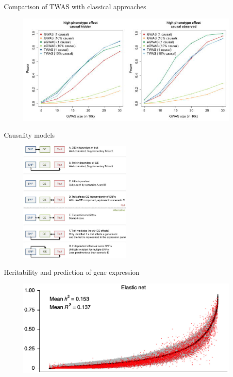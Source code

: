 \documentclass[aspectratio=169,12pt]{beamer}
\begin{document}
\begin{frame}{Comparison of TWAS with classical approaches}

	\begin{figure}
		\includegraphics[width=\textwidth]{gusev2016/5-association_power}
	\end{figure}


\end{frame}

\begin{frame}{Causality models}

	\begin{figure}
		\includegraphics[width=0.5\textwidth]{gusev2016/2-causality_models}
	\end{figure}

\end{frame}

\begin{frame}{Heritability and prediction of gene expression}

	\begin{figure}
		\includegraphics[width=\textwidth]{gamazon2015/3-prediction_r2}
	\end{figure}

\end{frame}
\end{document}
